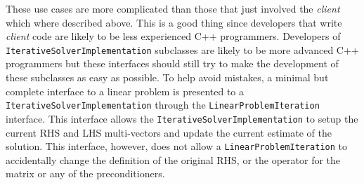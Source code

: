 \documentclass[pdf,ps2pdf,11pt]{SANDreport}
\begin{document}
These use cases are more complicated than those that just involved the
{}\textit{client} which where described above.  This is a good thing
since developers that write {}\textit{client} code are likely to be
less experienced C++ programmers.  Developers of
{}\texttt{Iterative\-Solver\-Implementation} subclasses are likely to
be more advanced C++ programmers but these interfaces should still try
to make the development of these subclasses as easy as possible.  To
help avoid mistakes, a minimal but complete interface to a linear
problem is presented to a {}\texttt{Iterative\-Solver\-Implementation}
through the {}\texttt{Linear\-Problem\-Iteration} interface.  This
interface allows the {}\texttt{Iterative\-Solver\-Implementation} to
setup the current RHS and LHS multi-vectors and update the current
estimate of the solution.  This interface, however, does not allow a
{}\texttt{Linear\-Problem\-Iteration} to accidentally change the
definition of the original RHS, or the operator for the matrix or any
of the preconditioners.
\end{document}
